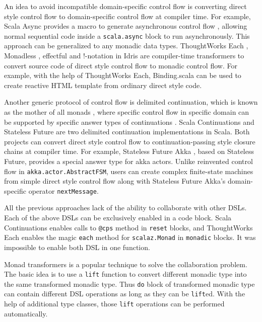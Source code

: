An idea to avoid incompatible domain-specific control flow is converting direct style control flow to domain-specific control flow at compiler time. For example, Scala Async provides a macro to generate asynchronous control flow \cite{haller2013sip}, allowing normal sequential code inside a \lstinline{scala.async} block to run asynchronously. This approach can be generalized to any monadic data types. ThoughtWorks Each \cite{yangbo2015each}, Monadless \cite{flavio2017monadless}, effectful \cite{crockett2013effectful} and !-notation in Idris \cite{brady2013idris} are compiler-time transformers to convert source code of direct style control flow to monadic control flow. For example, with the help of ThoughtWorks Each, Binding.scala\cite{yangbo2016binding} can be used to create reactive HTML template from ordinary direct style code.

Another generic protocol of control flow is delimited continuation, which is known as the mother of all monads \cite{piponi2008mother}, where specific control flow in specific domain can be supported by specific answer types of continuations \cite{asai2007polymorphic}. Scala Continuations \cite{rompf2009implementing} and Stateless Future \cite{yangbo2014stateless} are two delimited continuation implementations in Scala. Both projects can convert direct style control flow to continuation-passing style closure chains at compiler time. For example, Stateless Future Akka \cite{yangbo2014statelessfutureakka}, based on Stateless Future, provides a special answer type for akka actors. Unlike reinvented control flow in \lstinline{akka.actor.AbstractFSM}, users can create complex finite-state machines from simple direct style control flow along with Stateless Future Akka's domain-specific operator \lstinline{nextMessage}.

All the previous approaches lack of the ability to collaborate with other DSLs. Each of the above DSLs can be exclusively enabled in a code block. Scala Continuations enables calls to \lstinline{@cps} method in \lstinline{reset} blocks, and ThoughtWorks Each enables the magic \lstinline{each} method \cite{yangbo2015each} for \lstinline{scalaz.Monad} in \lstinline{monadic} blocks. It was impossible to enable both DSL in one function.

Monad transformers \cite{liang1995monad} is a popular technique to solve the collaboration problem. The basic idea is to use a \lstinline{lift} function to convert different monadic type into the same transformed monadic type. Thus \lstinline{do} block of transformed monadic type can contain different DSL operations as long as they can be \lstinline{lift}ed. With the help of additional type classes, those \lstinline{lift} operations can be performed automatically.

